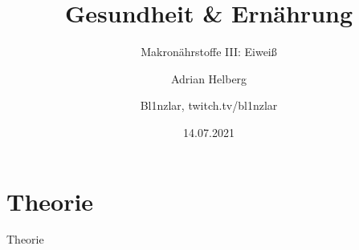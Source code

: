 \documentclass[xcolor=dvipsnames]{beamer}
\title{Gesundheit \& Ernährung}
\subtitle{Makronährstoffe III: Eiweiß}
\author{Adrian Helberg}
\author{Bl1nzlar, twitch.tv/bl1nzlar}
\date{14.07.2021}
\begin{document}
    \maketitle


    \section{Theorie}
    {
    \begin{frame}
        \begin{center}
            \Huge Theorie
        \end{center}
    \end{frame}
    }
\end{document}
